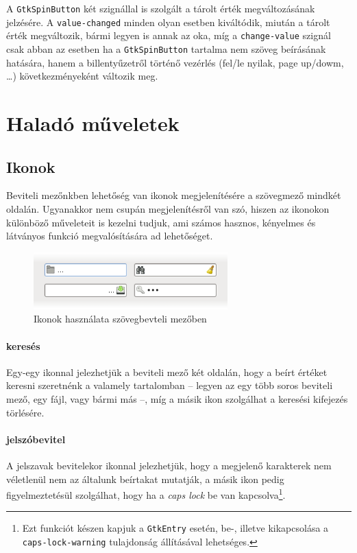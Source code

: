 A \texttt{GtkSpinButton} két szignállal is szolgált a tárolt érték megváltozásának jelzésére. A \texttt{value-changed} minden olyan esetben kiváltódik, miután a tárolt érték megváltozik, bármi legyen is annak az oka, míg a \texttt{change-value} szignál csak abban az esetben ha a \texttt{GtkSpinButton} tartalma nem szöveg beírásának hatására, hanem a billentyűzetről történő vezérlés (fel/le nyilak, page up/dowm, \dots) következményeként változik meg.

\section{Haladó műveletek}

\subsection{Ikonok}

Beviteli mezőnkben lehetőség van ikonok megjelenítésére a szövegmező mindkét oldalán. Ugyanakkor nem csupán megjelenítésről van szó, hiszen az ikonokon különböző műveleteit is kezelni tudjuk, ami számos hasznos, kényelmes és látványos funkció megvalósítására ad lehetőséget.

\begin{figure}[h]
\begin{center}
\includegraphics[width=75mm]{images/entry-icons.png}
\caption{Ikonok használata szövegbevteli mezőben}
\end{center}
\end{figure}

\paragraph{keresés} Egy-egy ikonnal jelezhetjük a beviteli mező két oldalán, hogy a beírt értéket keresni szeretnénk a valamely tartalomban -- legyen az egy több soros beviteli mező, egy fájl, vagy bármi más --, míg a másik ikon szolgálhat a keresési kifejezés törlésére.
\paragraph{jelszóbevitel} A jelszavak bevitelekor ikonnal jelezhetjük, hogy a megjelenő karakterek nem véletlenül nem az általunk beírtakat mutatják, a másik ikon pedig figyelmeztetésül szolgálhat, hogy ha a \textit{caps lock} be van kapcsolva\footnote{Ezt funkciót készen kapjuk a \texttt{GtkEntry} esetén, be-, illetve kikapcsolása a \texttt{caps-lock-warning} tulajdonság állításával lehetséges.}.
